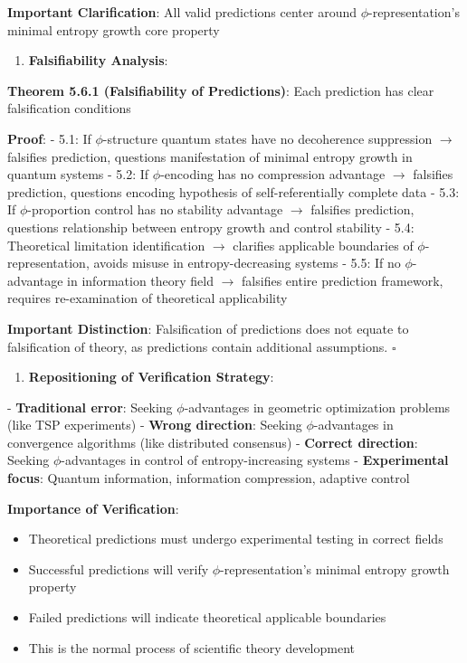    \textbf{Important Clarification}: All valid predictions center around $\phi$-representation's minimal entropy growth core property

\begin{enumerate}
\item \textbf{Falsifiability Analysis}:
\end{enumerate}
   \textbf{Theorem 5.6.1 (Falsifiability of Predictions)}: Each prediction has clear falsification conditions
\label{thm:5.6.1}
   
   \textbf{Proof}:
   - 5.1: If $\phi$-structure quantum states have no decoherence suppression $\rightarrow$ falsifies prediction, questions manifestation of minimal entropy growth in quantum systems
   - 5.2: If $\phi$-encoding has no compression advantage $\rightarrow$ falsifies prediction, questions encoding hypothesis of self-referentially complete data
   - 5.3: If $\phi$-proportion control has no stability advantage $\rightarrow$ falsifies prediction, questions relationship between entropy growth and control stability
   - 5.4: Theoretical limitation identification $\rightarrow$ clarifies applicable boundaries of $\phi$-representation, avoids misuse in entropy-decreasing systems
   - 5.5: If no $\phi$-advantage in information theory field $\rightarrow$ falsifies entire prediction framework, requires re-examination of theoretical applicability
   
   \textbf{Important Distinction}: Falsification of predictions does not equate to falsification of theory, as predictions contain additional assumptions. $\square$

\begin{enumerate}
\item \textbf{Repositioning of Verification Strategy}:
\end{enumerate}
   - \textbf{Traditional error}: Seeking $\phi$-advantages in geometric optimization problems (like TSP experiments)
   - \textbf{Wrong direction}: Seeking $\phi$-advantages in convergence algorithms (like distributed consensus)
   - \textbf{Correct direction}: Seeking $\phi$-advantages in control of entropy-increasing systems
   - \textbf{Experimental focus}: Quantum information, information compression, adaptive control

\textbf{Importance of Verification}:

\begin{itemize}
\item Theoretical predictions must undergo experimental testing in correct fields
\item Successful predictions will verify $\phi$-representation's minimal entropy growth property
\item Failed predictions will indicate theoretical applicable boundaries
\item This is the normal process of scientific theory development
\end{itemize}

